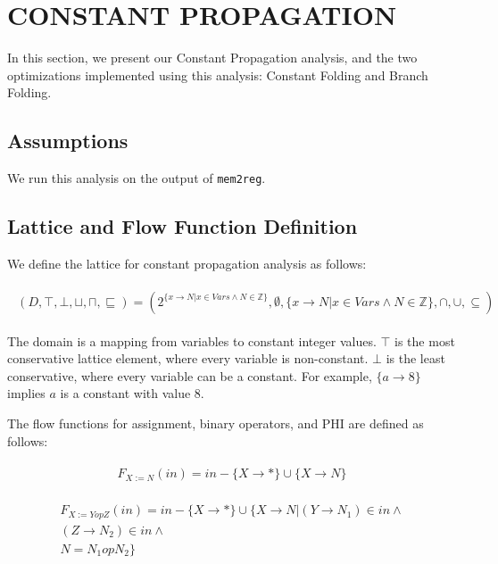 \section{CONSTANT PROPAGATION}

In this section, we present our Constant Propagation analysis, and the two optimizations implemented using this analysis: Constant Folding and Branch Folding.

\subsection{Assumptions}

We run this analysis on the output of \texttt{mem2reg}. 

\subsection{Lattice and Flow Function Definition}

We define the lattice for constant propagation analysis as follows:

\begin{align} 
	\begin{split}
		(D, \top, \bot, \sqcup, \sqcap, \sqsubseteq) = (2^{\{x \to N | x \in Vars \wedge N \in \mathbb{Z}\}}, \emptyset, \{x \to N | x \in Vars \wedge N \in \mathbb{Z}\}, \cap, \cup, \subseteq)
	\end{split}
\end{align}

The domain is a mapping from variables to constant integer values. $\top$ is the most conservative lattice element, where every variable is non-constant. $\bot$ is the least conservative, where every variable can be a constant. For example, $\{a \rightarrow 8\}$ implies $a$ is a constant with value 8.

The flow functions for assignment, binary operators, and PHI are defined as follows:

\begin{align} 
	\begin{split}
		F_{X := N}(in) = in  - \{ X \to *\} \cup \{ X \to N \}
	\end{split}
\end{align}

\begin{align} 
	\begin{split}
		F_{X := Y op Z}(in) = in  - \{ X \to *\} \cup \{ X \to N | (Y \to N_1) \in in \wedge \\
		(Z \to N_2) \in in \wedge \\
		N = N_1 op N_2\}
	\end{split}
\end{align}

